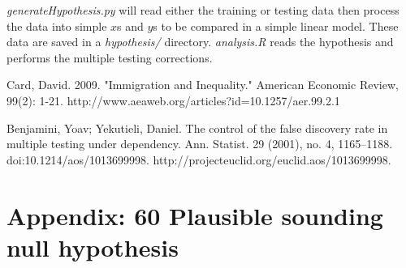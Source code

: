 \documentclass[11pt]{article}
\theoremstyle{definition}
\theoremstyle{remark}
\begin{document}
\textit{generateHypothesis.py} will read either the training or testing data
then process the data into simple $x$s and $y$s to be compared in a simple
linear model. These data are saved in a \textit{hypothesis/} directory.
\textit{analysis.R} reads the hypothesis and performs the multiple testing
corrections.


\begin{thebibliography}
\small
     Card, David. 2009. "Immigration and Inequality." American Economic Review, 99(2): 1-21. http://www.aeaweb.org/articles?id=10.1257/aer.99.2.1

     Benjamini, Yoav; Yekutieli, Daniel. The control of the false discovery rate in multiple testing under dependency. Ann. Statist. 29 (2001), no. 4, 1165--1188. doi:10.1214/aos/1013699998. http://projecteuclid.org/euclid.aos/1013699998.
\end{thebibliography}



\section{Appendix: 60 Plausible sounding null hypothesis}

\setlength{\parskip}{0em}
\end{document}
